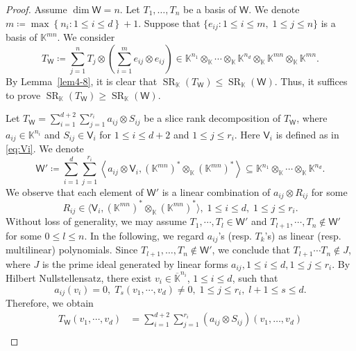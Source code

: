 \documentclass[10pt]{article}
\theoremstyle{definition}
\DeclareMathOperator{\sr}{SR}
\begin{document}
\begin{proof} 
Assume $\dim \mathsf{W} = n$.  Let $T_1,\dots,  T_n$ be a basis of $\mathsf{W}$.  We denote $m \coloneqq \max \left\lbrace n_i: 1 \le i \le d \right\rbrace+1$.  Suppose that $\{e_{ij}: 1 \le i \le m,\; 1 \le j \le n \}$ is a basis of $\mathbb{K}^{mn}$.  We consider
\[
T_{\mathsf{W}} \coloneqq \sum_{j=1}^{n} T_{j}\otimes  \left( \sum_{i=1}^{m}  e_{ij} \otimes e_{ij} \right) \in \mathbb{K}^{n_1} \otimes_{\mathbb{K}}   \cdots \otimes_{\mathbb{K}}  \mathbb{K}^{n_d} \otimes_{\mathbb{K}}  \mathbb{K}^{mn} \otimes_{\mathbb{K}}  \mathbb{K}^{mn}. 
\]
By Lemma~\ref{lem4-8},  it is clear that $\sr_{\mathbb{K}}(T_{\mathsf{W}}) \le \sr_{\mathbb{K}}(\mathsf{W})$.  Thus, it suffices to prove $\sr_{\mathbb{K}}(T_{\mathsf{W}}) \ge \sr_{\mathbb{K}}(\mathsf{W})$. 

Let $T_{\mathsf{W}}=\sum_{i=1}^{d+2}\sum_{j=1}^{r_i} a_{ij}\otimes S_{ij}$ be a slice rank decomposition of $T_{\mathsf{W}}$,  where $a_{ij} \in \mathbb{K}^{n_i}$ and $S_{ij} \in \mathsf{V}_i$ for $1 \le i \le d+2$ and $1\le j \le r_i$.  Here $\mathsf{V}_i$ is defined as in \eqref{eq:Vi}.  We denote 
\[
\mathsf{W}' \coloneqq \sum_{i=1}^{d }\sum_{j=1}^{r_i}  \left\langle a_{ij}\otimes \mathsf{V}_i,  (\mathbb{K}^{mn})^\ast \otimes_{\mathbb{K}}  (\mathbb{K}^{mn})^\ast \right\rangle \subseteq \mathbb{K}^{n_1} \otimes_{\mathbb{K}}  \cdots \otimes_{\mathbb{K}}  \mathbb{K}^{n_d}.
\]
%
%
%
%
We observe that each element of $\mathsf{W}'$ is a linear combination of $a_{ij} \otimes R_{ij}$ for some 
\[
R_{ij} \in \langle \mathsf{V}_{i},  (\mathbb{K}^{mn})^\ast \otimes_{\mathbb{K}}  (\mathbb{K}^{mn})^\ast \rangle, \; 1\le i \le d,\; 1 \le j \le r_i.
\]
Without loss of generality,  we may assume $T_{1},\cdots, T_{l}\in \mathsf{W}'$ and $T_{l+1},\cdots,T_{n}\notin \mathsf{W}'$ for some $0 \le l \le n$. 
In the following,  we regard $a_{ij}$'s (resp.  $T_k$'s) as linear (resp.  multilinear) polynomials.  Since $T_{l+1}, \dots,  T_{n} \not\in \mathsf{W}'$,  we conclude that $T_{l+1}\cdots T_{n}  \notin J$, where $J$ is the prime ideal generated by  linear forms $a_{ij},  1\le i \le d,  1 \le j \le r_i$.  By Hilbert Nullstellensatz,  there exist $v_i\in \overline{\mathbb{K}}^{n_i}$,  $1\le i\le d$, such that 
\[
a_{ij}(v_{i})=0,\; T_{s}(v_{1},\cdots,v_{d})\not=0,\;1\le j\le r_{i},\; l+1\le s\le d.
\]
Therefore,  we obtain 
\begin{align}
T_{\mathsf{W}}(v_{1},\cdots,v_{d})&=\sum_{i=1}^{d+2}\sum_{j=1}^{r_{i}} (a_{ij} \otimes S_{ij})( v_1,\dots, v_{d} ) \nonumber \\

\end{align}
\end{proof}
\end{document}
